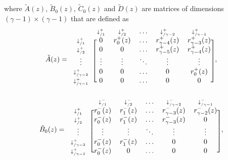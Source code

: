 \documentclass{article}
\begin{document}
where $\tilde{A}(z)$, $\tilde{B}_0(z)$, $\tilde{C}_0(z)$ and
$\tilde{D}(z)$ are matrices of dimensions $(\gamma-1) \times (\gamma-1)$
that are defined as
\begin{equation*}
\tilde{A}(z) = 
\begin{blockarray}{cccccc}
   & \scriptstyle{\downarrow_{/1}^+} & \scriptstyle{\downarrow_{/2}^+} &
    \ldots & \scriptstyle{\downarrow_{/\gamma-2}^+} &
    \scriptstyle{\downarrow_{/\gamma-1}^+} \\
\begin{block}{c[ccccc]}
\scriptstyle{\downarrow_{/1}^+} & 0 & r_0^+(z) & \ldots &
    r_{\gamma-4}^+(z) & r_{\gamma-3}^+(z) \\
\scriptstyle{\downarrow_{/2}^+} & 0 & 0 & \ldots &
    r_{\gamma-5}^+(z) & r_{\gamma-4}^+(z) \\
\vdots & \vdots & \vdots & \ddots & \vdots & \vdots \\
\scriptstyle{\downarrow_{/\gamma-2}^+} & 0 & 0 & \ldots & 0 & r_0^+(z) \\
\scriptstyle{\downarrow_{/\gamma-1}^+} & 0 & 0 & \ldots & 0 & 0 \\
\end{block}
\end{blockarray},
\end{equation*}
\begin{equation*}
\tilde{B}_0(z) = 
\begin{blockarray}{cccccc}
   & \scriptstyle{\downarrow_{/1}^-} & \scriptstyle{\downarrow_{/2}^-} &
   \ldots & \scriptstyle{\downarrow_{/\gamma-2}^-} &
   \scriptstyle{\downarrow_{/\gamma-1}^-} \\
\begin{block}{c[ccccc]}
\scriptstyle{\downarrow_{/1}^+} & r_0^-(z) & r_1^-(z) & \ldots &
    r_{\gamma-3}^-(z) & r_{\gamma-2}^-(z) \\
\scriptstyle{\downarrow_{/2}^+} & r_0^-(z) & r_1^-(z) & \ldots &
    r_{\gamma-3}^-(z) & 0 \\
\vdots & \vdots & \vdots & \ddots & \vdots & \vdots \\
\scriptstyle{\downarrow_{/\gamma-2}^+} & r_0^-(z) & r_1^-(z) &
    \ldots & 0 & 0 \\
\scriptstyle{\downarrow_{/\gamma-1}^+} & r_0^-(z) & 0 & \ldots & 0 & 0 \\
\end{block}
\end{blockarray},
\end{equation*}
\end{document}
